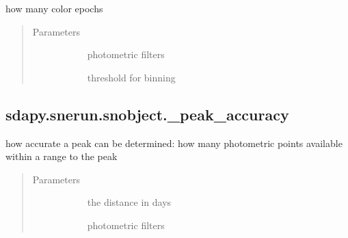 \documentclass[letterpaper,10pt,english]{sphinxmanual}
\begin{document}
\begin{fulllineitems}
\label{\detokenize{generated/sdapy.snerun.snobject._ncolors:sdapy.snerun.snobject._ncolors}}
how many color epochs
\begin{quote}\begin{description}
\item[{Parameters}] \leavevmode\begin{description}
\item[{}] \leavevmode{[}\sphinxtitleref{list}{]}
photometric filters

\item[{}] \leavevmode{[}\sphinxtitleref{float}{]}
threshold for binning

\end{description}

\end{description}\end{quote}

\end{fulllineitems}



\subsection{sdapy.snerun.snobject.\_peak\_accuracy}
\label{\detokenize{generated/sdapy.snerun.snobject._peak_accuracy:sdapy-snerun-snobject-peak-accuracy}}\label{\detokenize{generated/sdapy.snerun.snobject._peak_accuracy::doc}}

\begin{fulllineitems}
\label{\detokenize{generated/sdapy.snerun.snobject._peak_accuracy:sdapy.snerun.snobject._peak_accuracy}}
how accurate a peak can be determined: how many photometric points available within a range to the peak
\begin{quote}\begin{description}
\item[{Parameters}] \leavevmode\begin{description}
\item[{}] \leavevmode{[}\sphinxtitleref{int}{]}
the distance in days

\item[{}] \leavevmode{[}\sphinxtitleref{list}{]}
photometric filters

\end{description}

\end{description}\end{quote}

\end{fulllineitems}
\end{document}
